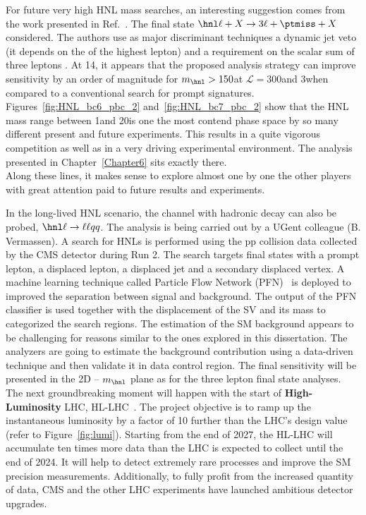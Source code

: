 For future very high HNL mass searches, an interesting suggestion comes from
the work presented in Ref.~\cite{Pascoli_2019}. The
final state $\hnl \ell + X\rightarrow 3\ell + \ptmiss + X$
considered. The
authors use as major
discriminant techniques a dynamic
jet veto (\ie it depends on the \pt of the highest \pt lepton) and a
requirement on the scalar sum of three leptons \pt. At 14\TeV, it appears that
the proposed analysis strategy can
improve sensitivity by an order of
magnitude for $m_\hnl > 150$\GeV at $\mathcal{L} = 300$\fbinv and
3\abinv when compared to a conventional search for prompt signatures. \\

Figures~\ref{fig:HNL_bc6_pbc_2} and~\ref{fig:HNL_bc7_pbc_2} show that
the HNL mass range between 1\GeV and 20\GeV is one the most contend phase
space by so many different present and future experiments. This
results in a quite vigorous competition as well as in a very driving
experimental environment. The analysis presented in Chapter~\ref{Chapter6} sits exactly there. \\
Along these lines, it makes sense to explore almost one by one the
other players with great attention paid to future results and experiments.

In the long-lived HNL scenario, the channel with hadronic \PW decay
can also be probed, \ie $\hnl \ell \rightarrow \ell \ell q q $. The analysis is being carried out by a UGent
colleague (B. Vermassen). A search for HNLs is performed using the pp collision
data collected by the CMS detector during Run
2. The search targets final states with a prompt lepton, a displaced lepton, a
displaced jet and a secondary displaced vertex. A machine learning technique called Particle Flow Network (PFN)~\cite{Komiske_2019} is deployed to
improved the separation between signal and background.
The output of the PFN classifier is used together with the
displacement of the SV and its mass to categorized the search regions.
The estimation of the SM background appears to be challenging for
reasons similar to the ones explored in this dissertation. The
analyzers are going to estimate the background contribution using a data-driven 
technique and then validate it in data control region. The
final sensitivity will be presented in the 2D \mixpar -- $m_\hnl$
plane as for the three lepton final state analyses.\\

The next groundbreaking moment will happen with the start of
\textbf{High-Luminosity} LHC,
HL-LHC~\cite{ZurbanoFernandez:2020cco}. The project objective is to ramp up the instantaneous luminosity by a factor of 10 further than the LHC’s design value
(refer to Figure~\ref{fig:lumi}).
Starting from the end of 2027, the HL-LHC will accumulate ten times
more data than the LHC is expected to collect until the end of 2024. It will help to
detect extremely rare processes and improve the SM precision
measurements. Additionally, to fully profit from the increased quantity of data, CMS and the other
LHC experiments have launched ambitious detector upgrades.

